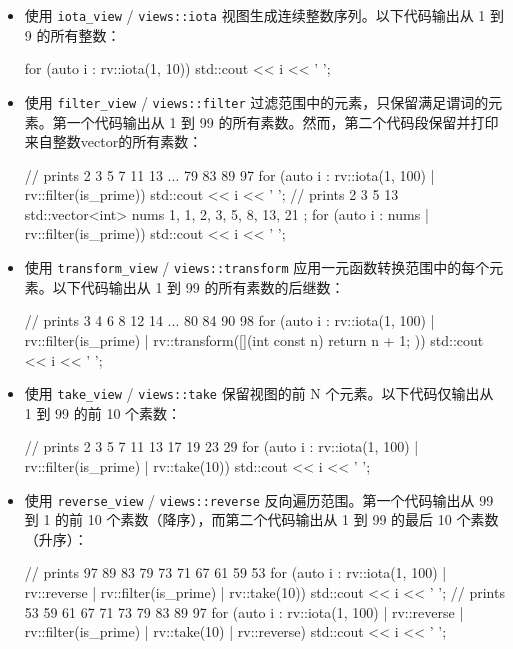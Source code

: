 \begin{itemize}
\item
使用 \verb|iota_view| / \verb|views::iota| 视图生成连续整数序列。以下代码输出从 1 到 9 的所有整数：

\begin{cpp}
for (auto i : rv::iota(1, 10))
    std::cout << i << ' ';
\end{cpp}

\item
使用 \verb|filter_view| / \verb|views::filter| 过滤范围中的元素，只保留满足谓词的元素。第一个代码输出从 1 到 99 的所有素数。然而，第二个代码段保留并打印来自整数vector的所有素数：

\begin{cpp}
// prints 2 3 5 7 11 13 ... 79 83 89 97
for (auto i : rv::iota(1, 100) | rv::filter(is_prime))
    std::cout << i << ' ';
// prints 2 3 5 13
std::vector<int> nums{ 1, 1, 2, 3, 5, 8, 13, 21 };
for (auto i : nums | rv::filter(is_prime))
    std::cout << i << ' ';
\end{cpp}

\item
使用 \verb|transform_view| / \verb|views::transform| 应用一元函数转换范围中的每个元素。以下代码输出从 1 到 99 的所有素数的后继数：

\begin{cpp}
// prints 3 4 6 8 12 14 ... 80 84 90 98
for (auto i : rv::iota(1, 100) |
              rv::filter(is_prime) |
              rv::transform([](int const n) {return n + 1; }))
    std::cout << i << ' ';
\end{cpp}

\item
使用 \verb|take_view| / \verb|views::take| 保留视图的前 N 个元素。以下代码仅输出从 1 到 99 的前 10 个素数：

\begin{cpp}
// prints 2 3 5 7 11 13 17 19 23 29
for (auto i : rv::iota(1, 100) |
              rv::filter(is_prime) |
              rv::take(10))
    std::cout << i << ' ';
\end{cpp}

\item
使用 \verb|reverse_view| / \verb|views::reverse| 反向遍历范围。第一个代码输出从 99 到 1 的前 10 个素数（降序），而第二个代码输出从 1 到 99 的最后 10 个素数（升序）：

\begin{cpp}
// prints 97 89 83 79 73 71 67 61 59 53
for (auto i : rv::iota(1, 100) |
              rv::reverse |
              rv::filter(is_prime) |
              rv::take(10))
    std::cout << i << ' ';
// prints 53 59 61 67 71 73 79 83 89 97
for (auto i : rv::iota(1, 100) |
              rv::reverse |
              rv::filter(is_prime) |
              rv::take(10) |
              rv::reverse)
    std::cout << i << ' ';
\end{cpp}


\end{itemize}
